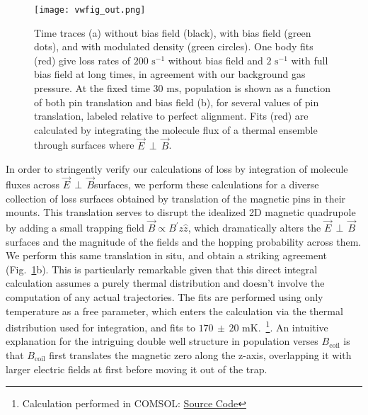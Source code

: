 \documentclass[%
 reprint,
 amsmath,amssymb,
 aps,
prl,
]{revtex4-1}
\newcommand{\bcl}{{$B_\text{coil}$}}
\newcommand{\epb}{{$\vec{E}\,{\perp}\,\vec{B}$}}
\begin{document}
\begin{figure}[tb]
\texttt{[image: vwfig\_out.png]}%
\caption{
Time traces (a) without bias field (black), with bias field (green dots), and with modulated density (green circles). 
One body fits (red) give loss rates of $200\text{ s}^{-1}$ without bias field and $2\text{ s}^{-1}$ with full bias field at long times, in agreement with our background gas pressure. 
At the fixed time $30\text{ ms}$, population is shown as a function of both pin translation and bias field (b), for several values of pin translation, labeled relative to perfect alignment. 
Fits (red) are calculated by integrating the molecule flux of a thermal ensemble through surfaces where \epb.
\label{fig:WVplot}}
\end{figure}

In order to stringently verify our calculations of loss by integration of molecule fluxes across \epb surfaces, we perform these calculations for a diverse collection of loss surfaces obtained by translation of the magnetic pins in their mounts. 
This translation serves to disrupt the idealized 2D magnetic quadrupole by adding a small trapping field $\vec{B}\propto B^\prime z\hat{z}$, which dramatically alters the \epb surfaces and the magnitude of the fields and the hopping probability across them.
We perform this same translation in situ, and obtain a striking agreement (Fig.~\ref{fig:WVplot}b). 
This is particularly remarkable given that this direct integral calculation assumes a purely thermal distribution and doesn't involve the computation of any actual trajectories.
The fits are performed using only temperature as a free parameter, which enters the calculation via the thermal distribution used for integration, and fits to $170\,{\pm}\,20\text{ mK}$.~\footnote{Calculation performed in COMSOL: \href{https://github.com/dreens/spin-flip-integration/}{Source Code}}.
An intuitive explanation for the intriguing double well structure in population verses \bcl{} is that \bcl{} first translates the magnetic zero along the z-axis, overlapping it with larger electric fields at first before moving it out of the trap.
\end{document}

